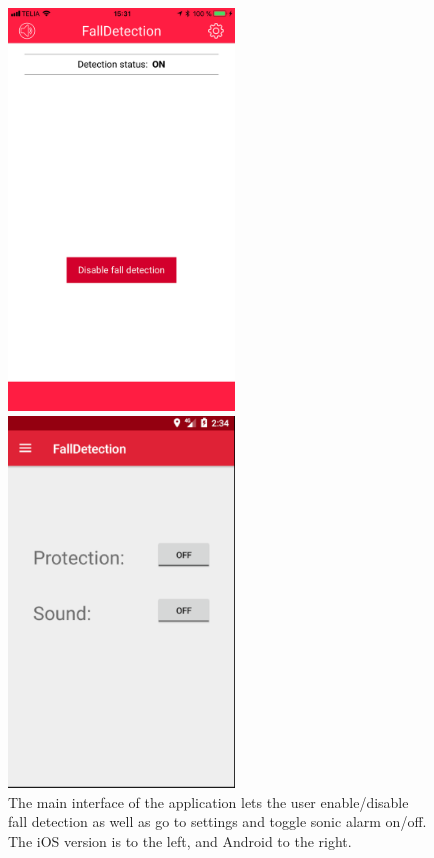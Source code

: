 \documentclass[12pt, a4paper, onecolumn]{article}
\begin{document}
	\begin{figure}[H]
		\begin{multicols}{2}
			\centering
			\includegraphics[width=6cm]{../img/screenshots/main-screen.jpg}\par 
			\includegraphics[width=6cm]{../img/screenshots/main-screen-android.png}\par 
		\end{multicols}
		\caption{The main interface of the application lets the user enable/disable fall detection as well as go to settings and toggle sonic alarm on/off. The iOS version is to the left, and Android to the right.}%
		\label{fig:main-screen}%
	\end{figure}
	
\end{document}
